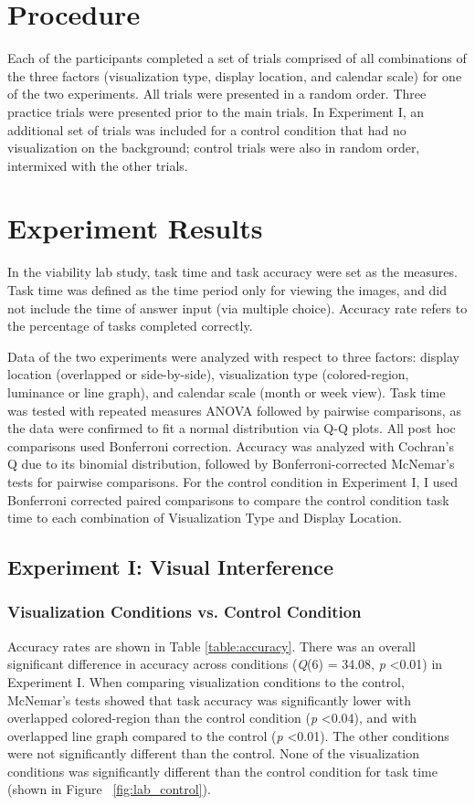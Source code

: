 \documentclass[12pt,oneside]{book}
\begin{document}
\section {Procedure}
Each of the participants completed a set of trials comprised of all combinations of the three factors (visualization type, display location, and calendar scale) for one of the two experiments.  All trials were presented in a random order.  Three practice trials were presented prior to the main trials.  In Experiment I, an additional set of trials was included for a control condition that had no visualization on the background; control trials were also in random order, intermixed with the other trials.

\section{Experiment Results}
In the viability lab study, task time and task accuracy were set as the measures. Task time was defined as the time period only for viewing the images, and did not include the time of answer input (via multiple choice). Accuracy rate refers to the percentage of tasks completed correctly.

Data of the two experiments were analyzed with respect to three factors: display location (overlapped or side-by-side), visualization type (colored-region, luminance or line graph), and calendar scale (month or week view). Task time was tested with repeated measures ANOVA followed by pairwise comparisons, as the data were confirmed to fit a normal distribution via Q-Q plots. All post hoc comparisons used Bonferroni correction. Accuracy was analyzed with Cochran’s Q due to its binomial distribution, followed by Bonferroni-corrected McNemar's tests for pairwise comparisons. For the control condition in Experiment I, I used Bonferroni corrected paired comparisons to compare the control condition task time to each combination of Visualization Type and Display Location.

\subsection{Experiment I: Visual Interference}
\subsubsection{Visualization Conditions vs. Control Condition}

Accuracy rates are shown in Table \ref{table:accuracy}. There was an overall significant difference in accuracy across conditions (\textit{Q}(6) = 34.08, \textit{p} \textless 0.01) in Experiment I. When comparing visualization conditions to the control, McNemar's tests showed that task accuracy was significantly lower with overlapped colored-region than the control condition (\textit{p} \textless 0.04), and with overlapped line graph compared to the control (\textit{p} \textless 0.01). The other conditions were not significantly different than the control. None of the visualization conditions was significantly different than the control condition for task time (shown in Figure ~\ref{fig:lab_control}).
\end{document}
